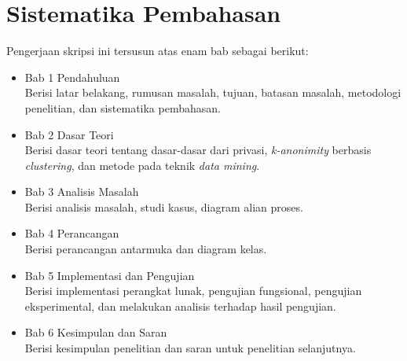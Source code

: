 \section{Sistematika Pembahasan}
\label{sec:sispem}
Pengerjaan skripsi ini tersusun atas enam bab sebagai berikut:
\begin{itemize}
\item Bab 1 Pendahuluan\\
Berisi latar belakang, rumusan masalah, tujuan, batasan masalah, metodologi penelitian, dan sistematika pembahasan.
\item Bab 2 Dasar Teori\\
Berisi dasar teori tentang dasar-dasar dari privasi, {\it k-anonimity} berbasis {\it clustering}, dan metode pada teknik {\it data mining}.
\item Bab 3 Analisis Masalah\\
Berisi analisis masalah, studi kasus, diagram alian proses.
\item Bab 4 Perancangan \\
Berisi perancangan antarmuka dan diagram kelas.
\item Bab 5 Implementasi dan Pengujian\\
Berisi implementasi perangkat lunak, pengujian fungsional, pengujian eksperimental, dan melakukan analisis terhadap hasil pengujian.
\item Bab 6 Kesimpulan dan Saran\\
Berisi kesimpulan penelitian dan saran untuk penelitian selanjutnya.
\end{itemize}

